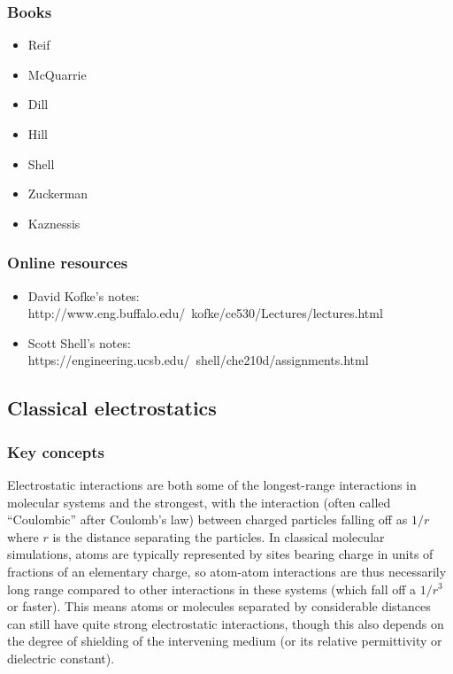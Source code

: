 \documentclass[9pt,bestpractices]{livecoms}
\begin{document}
\subsubsection{Books}
\begin{itemize}
\item Reif
\item McQuarrie
\item Dill
\item Hill
\item Shell
\item Zuckerman
\item Kaznessis
\end{itemize}
\subsubsection{Online resources}
\begin{itemize}
\item David Kofke's notes: http://www.eng.buffalo.edu/~kofke/ce530/Lectures/lectures.html
\item Scott Shell's notes: https://engineering.ucsb.edu/~shell/che210d/assignments.html
\end{itemize}

\subsection{Classical electrostatics}
\label{ref:classical_electrostatics}
\subsubsection{Key concepts}

Electrostatic interactions are both some of the longest-range interactions in
molecular systems and the strongest, with the interaction (often called
``Coulombic'' after Coulomb's law) between charged particles falling off as
$1/r$ where $r$ is the distance separating the particles.  In classical
molecular simulations, atoms are typically represented by sites bearing charge
in units of fractions of an elementary charge, so atom-atom interactions are
thus necessarily long range compared to other interactions in these systems
(which fall off a $1/r^3$ or faster).  This means atoms or molecules separated
by considerable distances can still have quite strong electrostatic
interactions, though this also depends on the degree of shielding of the
intervening medium (or its relative permittivity or dielectric constant).
\end{document}
